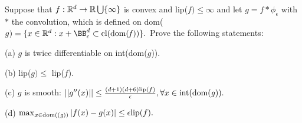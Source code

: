 \begin{exercise}[]{}
Suppose that $f:\mathbb{R}^d \to \mathbb{R} \bigcup \{\infty\}$ is convex
and lip($f) \leq \infty$ and let $g = f *\phi_\epsilon$ with $*$
the convolution, which is defined on dom($g) =\{x\in \real^d:x + \BB_\epsilon^d \subset \text{cl(dom(\textit{f}))} \}.$
Prove the following statements:

(a) $g$ is twice differentiable on int(dom($g$)).

(b) lip($g) \leq$ lip($f$).

(c) $g$ is smooth: $||g''(x)|| \leq \frac{(d+1)(d+6)\text{lip}(f)}{\epsilon}, \forall x \in \text{int(dom(\textit{g}))}.$

(d) $\max_{x \in \text{dom((\textit{g}))}} |f(x)-g(x)|\leq \epsilon\text{lip}(f).$
\end{exercise}

\begin{solution}[TODO]
\end{solution}
